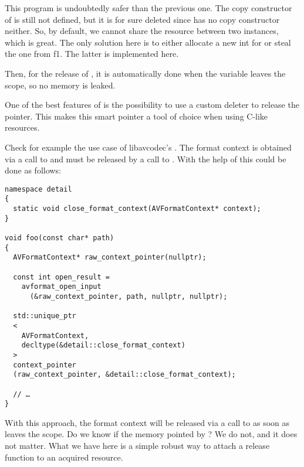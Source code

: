 This program is undoubtedly safer than the previous one. The copy
constructor of  is still not defined, but it is for sure
deleted since  has no copy constructor
neither. So, by default, we cannot share the resource between two
instances, which is great. The only solution here is to either
allocate a new int for  or steal the one from {f1}. The
latter is implemented here.

Then, for the release of , it is automatically done when the
variable leaves the scope, so no memory is leaked.

\bigskip

One of the best features of  is the possibility
to use a custom deleter to release the pointer. This makes this smart
pointer a tool of choice when using C-like resources.

Check for example the use case of libavcodec's
. The format context is obtained via a call to
 and must be released by a call to
. With the help of
 this could be done as follows:

\begin{lstlisting}
namespace detail
{
  static void close_format_context(AVFormatContext* context);
}

void foo(const char* path)
{
  AVFormatContext* raw_context_pointer(nullptr);

  const int open_result =
    avformat_open_input
      (&raw_context_pointer, path, nullptr, nullptr);

  std::unique_ptr
  <
    AVFormatContext,
    decltype(&detail::close_format_context)
  >
  context_pointer
  (raw_context_pointer, &detail::close_format_context);

  // …
}
\end{lstlisting}

With this approach, the format context will be released via a call to
 as soon as
 leaves the scope. Do we know if the memory
pointed by ? We do not, and it does not
matter. What we have here is a simple robust way to attach a release
function to an acquired resource.

\subsection{}

